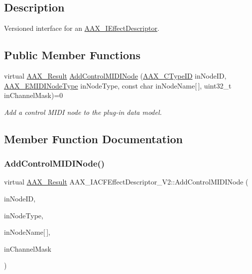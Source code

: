 \subsection{Description}
Versioned interface for an \mbox{\hyperlink{a01813}{A\+A\+X\+\_\+\+I\+Effect\+Descriptor}}. \subsection*{Public Member Functions}
\begin{DoxyCompactItemize}
\item 
virtual \mbox{\hyperlink{a00392_a4d8f69a697df7f70c3a8e9b8ee130d2f}{A\+A\+X\+\_\+\+Result}} \mbox{\hyperlink{a01657_a2ac5294b1db8881bb125e7ee6e4b4f4f}{Add\+Control\+M\+I\+D\+I\+Node}} (\mbox{\hyperlink{a00392_ac678f9c1fbcc26315d209f71a147a175}{A\+A\+X\+\_\+\+C\+Type\+ID}} in\+Node\+ID, \mbox{\hyperlink{a00491_a5e1dffce35d05990dbbad651702678e4}{A\+A\+X\+\_\+\+E\+M\+I\+D\+I\+Node\+Type}} in\+Node\+Type, const char in\+Node\+Name\mbox{[}$\,$\mbox{]}, uint32\+\_\+t in\+Channel\+Mask)=0
\begin{DoxyCompactList}\small\item\em Add a control M\+I\+DI node to the plug-\/in data model. \end{DoxyCompactList}\end{DoxyCompactItemize}


\subsection{Member Function Documentation}
\mbox{\label{a01657_a2ac5294b1db8881bb125e7ee6e4b4f4f}} 
\subsubsection{\texorpdfstring{AddControlMIDINode()}{AddControlMIDINode()}}
{\footnotesize\ttfamily virtual \mbox{\hyperlink{a00392_a4d8f69a697df7f70c3a8e9b8ee130d2f}{A\+A\+X\+\_\+\+Result}} A\+A\+X\+\_\+\+I\+A\+C\+F\+Effect\+Descriptor\+\_\+\+V2\+::\+Add\+Control\+M\+I\+D\+I\+Node (\begin{DoxyParamCaption}\item[{\mbox{\hyperlink{a00392_ac678f9c1fbcc26315d209f71a147a175}{A\+A\+X\+\_\+\+C\+Type\+ID}}}]{in\+Node\+ID,  }\item[{\mbox{\hyperlink{a00491_a5e1dffce35d05990dbbad651702678e4}{A\+A\+X\+\_\+\+E\+M\+I\+D\+I\+Node\+Type}}}]{in\+Node\+Type,  }\item[{const char}]{in\+Node\+Name\mbox{[}$\,$\mbox{]},  }\item[{uint32\+\_\+t}]{in\+Channel\+Mask }\end{DoxyParamCaption})\hspace{0.3cm}{\ttfamily [pure virtual]}}



